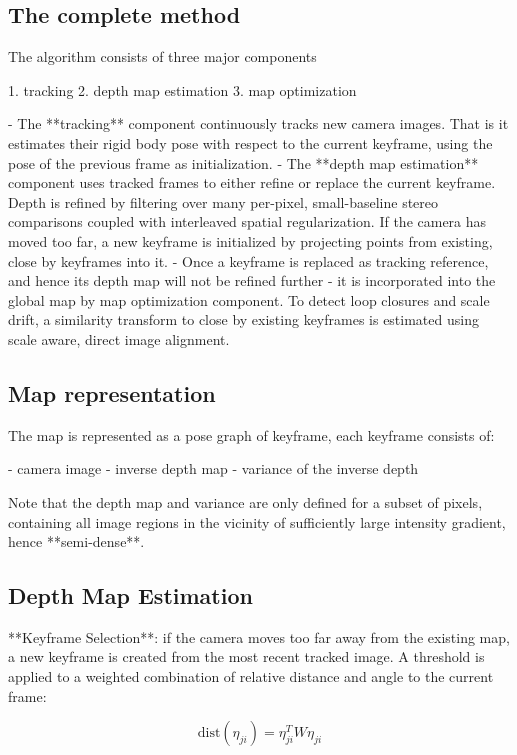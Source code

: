 \subsection{The complete method}
The algorithm consists of three major components

1. tracking
2. depth map estimation
3. map optimization

- The **tracking** component continuously tracks new camera images. That is it
  estimates their rigid body pose with respect to the current keyframe, using
  the pose of the previous frame as initialization.
- The **depth map estimation** component uses tracked frames to either refine
  or replace the current keyframe. Depth is refined by filtering over many
  per-pixel, small-baseline stereo comparisons coupled with interleaved spatial
  regularization. If the camera has moved too far, a new keyframe is
  initialized by projecting points from existing, close by keyframes into it.
- Once a keyframe is replaced as tracking reference, and hence its depth map
  will not be refined further - it is incorporated into the global map by map
  optimization component. To detect loop closures and scale drift, a similarity
  transform to close by existing keyframes is estimated using scale aware,
  direct image alignment.


\subsection{Map representation}

The map is represented as a pose graph of keyframe, each keyframe consists of:

- camera image
- inverse depth map
- variance of the inverse depth

Note that the depth map and variance are only defined for a subset of pixels,
containing all image regions in the vicinity of sufficiently large intensity
gradient, hence **semi-dense**.


\subsection{Depth Map Estimation}

**Keyframe Selection**: if the camera moves too far away from the existing map, a new keyframe is created from the most recent tracked image. A threshold is applied to a weighted combination of relative distance and angle to the current frame:

\begin{equation}
  \text{dist}(\eta_{ji}) = \eta_{ji}^{T} W \eta_{ji}
\end{equation}

